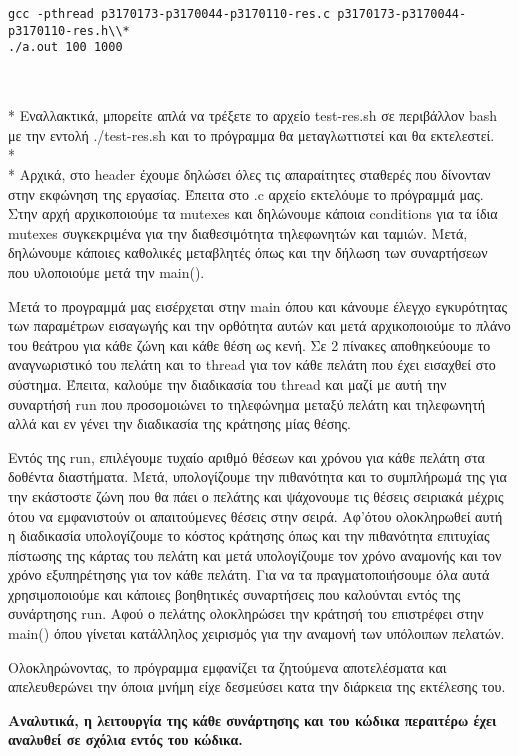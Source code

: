 \documentclass{article}
\begin{document}
{\begin{lstlisting}
gcc -pthread p3170173-p3170044-p3170110-res.c p3170173-p3170044-p3170110-res.h\\*
./a.out 100 1000 


\end{lstlisting}
\\*
Εναλλακτικά, μπορείτε απλά να τρέξετε το αρχείο test-res.sh σε περιβάλλον bash με την εντολή 
./test-res.sh και το πρόγραμμα θα μεταγλωττιστεί και θα εκτελεστεί.\\*
\\*
Αρχικά, στο header έχουμε δηλώσει όλες τις απαραίτητες σταθερές που δίνονταν στην εκφώνηση της εργασίας. Έπειτα στο .c αρχείο εκτελόυμε το πρόγραμμά μας. Στην αρχή αρχικοποιούμε τα mutexes και δηλώνουμε κάποια conditions για τα ίδια mutexes συγκεκριμένα για την διαθεσιμότητα τηλεφωνητών και ταμιών. Μετά, δηλώνουμε κάποιες καθολικές μεταβλητές όπως και την δήλωση των συναρτήσεων που υλοποιούμε μετά την main().

Μετά το προγραμμά μας εισέρχεται στην main όπου και κάνουμε έλεγχο εγκυρότητας των παραμέτρων εισαγωγής και την ορθότητα αυτών και μετά αρχικοποιούμε το πλάνο του θεάτρου για κάθε ζώνη και κάθε θέση ως κενή. Σε 2 πίνακες αποθηκεύουμε το αναγνωριστικό του πελάτη και το thread για τον κάθε πελάτη που έχει εισαχθεί στο σύστημα. Έπειτα, καλούμε την διαδικασία του thread και μαζί με αυτή την συναρτήσή run που προσομοιώνει το τηλεφώνημα μεταξύ πελάτη και τηλεφωνητή αλλά και εν γένει την διαδικασία της κράτησης μίας θέσης. 

Εντός της run, επιλέγουμε τυχαίο αριθμό θέσεων και χρόνου για κάθε πελάτη στα δοθέντα διαστήματα. Μετά, υπολογίζουμε την πιθανότητα και το συμπλήρωμά της για την εκάστοστε ζώνη που θα πάει ο πελάτης και ψάχονουμε τις θέσεις σειριακά μέχρις ότου να εμφανιστούν οι απαιτούμενες θέσεις στην σειρά. Αφ'ότου ολοκληρωθεί αυτή η διαδικασία υπολογίζουμε το κόστος κράτησης όπως και την πιθανότητα επιτυχίας πίστωσης της κάρτας του πελάτη και μετά υπολογίζουμε τον χρόνο αναμονής και τον χρόνο εξυπηρέτησης για τον κάθε πελάτη. Για να τα πραγματοποιήσουμε όλα αυτά χρησιμοποιούμε και κάποιες βοηθητικές συναρτήσεις που καλούνται εντός της συνάρτησης run. Aφού ο πελάτης ολοκληρώσει την κράτησή του επιστρέφει στην main() όπου γίνεται κατάλληλος χειρισμός για την αναμονή των υπόλοιπων πελατών. 

Ολοκληρώνοντας, το πρόγραμμα εμφανίζει τα ζητούμενα αποτελέσματα και απελευθερώνει την όποια μνήμη είχε δεσμεύσει κατα την διάρκεια της εκτέλεσης του.

\textbf{Αναλυτικά, η λειτουργία της κάθε συνάρτησης και του κώδικα περαιτέρω έχει αναλυθεί σε σχόλια εντός του κώδικα.}
}
\end{document}
